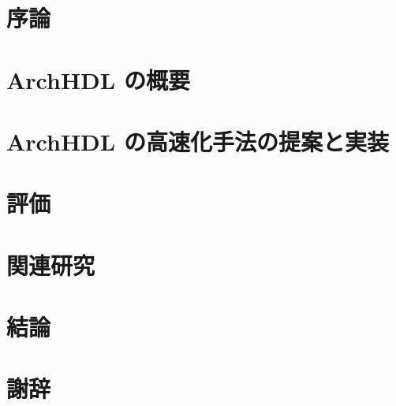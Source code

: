 % 


\frontmatter

\maketitle

\tableofcontents

\mainmatter

\chapter{序論}



\chapter{ArchHDL の概要}



\chapter{ArchHDL の高速化手法の提案と実装}



\chapter{評価}



\chapter{関連研究}



\chapter{結論}



\backmatter

\chapter{謝辞}



